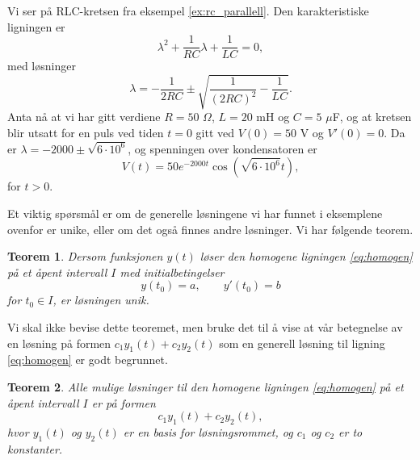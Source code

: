\documentclass{article}
\newtheorem{thm}{Teorem}\surroundwithmdframed{thm}
\theoremstyle{definition}
\newenvironment{ex}
{\pushQED{\qed}\renewcommand{\qedsymbol}{$\triangle$}\exx}
{\popQED\endexx}
\theoremstyle{remark}
\begin{document}
\begin{multicols*}{2}
\begin{ex}
  Vi ser på RLC-kretsen fra eksempel \ref{ex:rc_parallell}. Den karakteristiske ligningen er
  \begin{equation*}
    \lambda^2 + \frac{1}{RC} \lambda + \frac{1}{LC} = 0,
  \end{equation*}
  med løsninger
  \begin{equation*}
    \lambda = - \frac{1}{2 R C} \pm \sqrt{\frac{1}{(2 R C)^2} - \frac{1}{LC}}.
  \end{equation*}
  Anta nå at vi har gitt verdiene $R = 50$ $\Omega$, $L = 20 $ mH og $C = 5$ $\mu$F, og at kretsen blir utsatt for en puls ved tiden $t = 0$ gitt ved $V(0) = 50$ V og $V'(0) = 0$. Da er $\lambda = -2000 \pm \sqrt{6 \cdot 10^6}$, og spenningen over kondensatoren er
  \begin{equation*}
    V(t) = 50 e^{- 2000 t} \cos(\sqrt{6 \cdot 10^6} t),
  \end{equation*}
  for $t > 0$.
\end{ex}

Et viktig spørsmål er om de generelle løsningene vi har funnet i eksemplene ovenfor er unike, eller om det også finnes andre løsninger. Vi har følgende teorem.

\begin{thm}
  Dersom funksjonen $y(t)$ løser den homogene ligningen \eqref{eq:homogen} på et åpent intervall $I$ med initialbetingelser
  \begin{equation*}
    y(t_0) = a, \qquad y'(t_0) = b
  \end{equation*}
  for $t_0 \in I$, er løsningen unik.
\end{thm}

Vi skal ikke bevise dette teoremet, men bruke det til å vise at vår betegnelse av en løsning på formen $c_1 y_1(t) + c_2 y_2(t)$ som en generell løsning til ligning \eqref{eq:homogen} er godt begrunnet.

\begin{thm} \label{thm:unik}
  Alle mulige løsninger til den homogene ligningen \eqref{eq:homogen} på et åpent intervall $I$ er på formen
  \begin{equation*}
    c_1 y_1(t) + c_2 y_2(t),
  \end{equation*}
  hvor $y_1(t)$ og $y_2(t)$ er en basis for løsningsrommet, og $c_1$ og $c_2$ er to konstanter.
\end{thm}


\end{multicols*}
\end{document}
